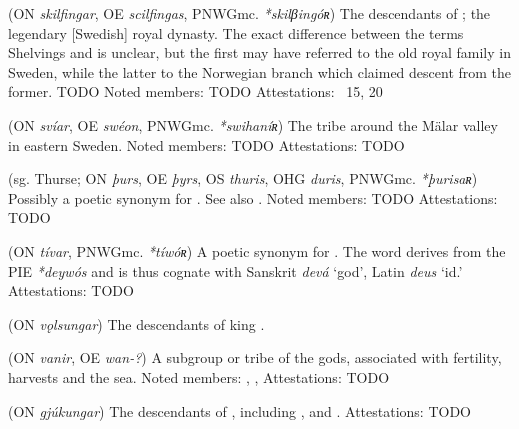 \begin{itemize}
 (ON \emph{skilfingar}, OE \emph{scilfingas}, PNWGmc. \emph{*skilβingóʀ})
  The descendants of ; the legendary [Swedish] royal dynasty. The exact difference between the terms Shelvings and  is unclear, but the first may have referred to the old royal family in Sweden, while the latter to the Norwegian branch which claimed descent from the former. TODO
  Noted members: TODO
  Attestations: \Hyndluljod\ 15, 20

 (ON \emph{svíar}, OE \emph{swéon}, PNWGmc. \emph{*swihaníʀ})
  The tribe around the Mälar valley in eastern Sweden.
  Noted members: TODO
  Attestations: TODO

 (sg. Thurse; ON \emph{þurs}, OE \emph{þyrs}, OS \emph{thuris}, OHG \emph{duris}, PNWGmc. \emph{*þurisaʀ})
  Possibly a poetic synonym for . See also .
  Noted members: TODO
  Attestations: TODO

 (ON \emph{tívar}, PNWGmc. \emph{*tíwóʀ})
  A poetic synonym for .  The word derives from the PIE \emph{*deywós} and is thus cognate with Sanskrit \emph{devá} ‘god’, Latin \emph{deus} ‘id.’
  Attestations: TODO

 (ON \emph{vǫlsungar})
  The descendants of king .

 (ON \emph{vanir}, OE \emph{wan-?})
  A subgroup or tribe of the gods, associated with fertility, harvests and the sea.
  Noted members: , , 
  Attestations: TODO

 (ON \emph{gjúkungar})
  The descendants of , including ,  and .
  Attestations: TODO
\end{itemize}

